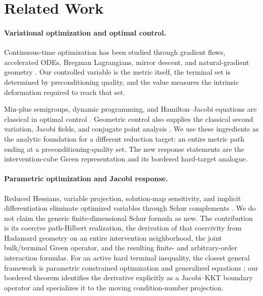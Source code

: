 \section{Related Work}
\label{sec:related}

\paragraph{Variational optimization and optimal control.}
Continuous-time optimization has been studied through gradient flows,
accelerated ODEs, Bregman Lagrangians, mirror descent, and natural-gradient
geometry
\cite{su2016differential,wibisono2016variational,krichene2015accelerated,
beck2003mirror,amari1998natural}.  Our controlled variable is the metric
itself, the terminal set is determined by preconditioning quality, and the
value measures the intrinsic deformation required to reach that set.

Min-plus semigroups, dynamic programming, and Hamilton--Jacobi equations are
classical in optimal control \cite{fleming2006controlled}.  Geometric control
also supplies the classical second variation, Jacobi fields, and conjugate
point analysis \cite{agrachev2004control}.  We use these ingredients as the
analytic foundation for a different reduction target: an entire metric path
ending at a preconditioning-quality set.  The new response statements are the
intervention-cube Green representation and its bordered hard-target analogue.

\paragraph{Parametric optimization and Jacobi response.}
Reduced Hessians, variable projection, solution-map sensitivity, and implicit
differentiation eliminate optimized variables through Schur complements
\cite{golub1973differentiation,bonnans2000perturbation,
dontchev2014implicit,amos2017optnet,blondel2022efficient,
franceschi2018bilevel}.  We do not claim the generic finite-dimensional Schur
formula as new.  The contribution is its coercive path-Hilbert realization,
the derivation of that coercivity from Hadamard geometry on an entire
intervention neighborhood, the joint bulk/terminal Green operator, and the
resulting finite- and arbitrary-order interaction formulas.  For an active hard
terminal inequality, the closest general framework is parametric constrained
optimization and generalized equations
\cite{bonnans2000perturbation,dontchev2014implicit}; our bordered theorem
identifies the derivative explicitly as a Jacobi--KKT boundary operator and
specializes it to the moving condition-number projection.

